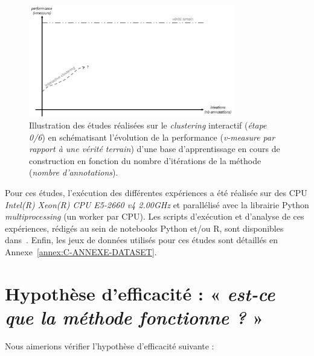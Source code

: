 	\begin{figure}[H]
		\centering
		\includegraphics[width=0.8\textwidth]{figures/hypotheses-00-default}
		\caption{Illustration des études réalisées sur le \textit{clustering} interactif (\textit{étape 0/6}) en schématisant l'évolution de la performance (\textit{v-measure par rapport à une vérité terrain}) d'une base d'apprentissage en cours de construction en fonction du nombre d'itérations de la méthode (\textit{nombre d'annotations}).}
		\label{figure:HYPOTHESE-00-DEFAULT}
	\end{figure}
	
	Pour ces études, l'exécution des différentes expériences a été réalisée sur des CPU \textit{Intel(R) Xeon(R) CPU E5-2660 v4 \@ 2.00GHz} et parallélisé avec la librairie Python \textit{multiprocessing} (un worker par CPU).
	Les scripts d'exécution et d'analyse de ces expériences, rédigés au sein de notebooks Python et/ou R, sont disponibles dans~\cite{schild:cognitivefactory-interactive-clustering-comparative-study:2021}.
	Enfin, les jeux de données utilisés pour ces études sont détaillés en Annexe~\ref{annex:C-ANNEXE-DATASET}.
	
	
    \minitoc

    \section{Hypothèse d'efficacité : « \textit{est-ce que la méthode fonctionne ?} »}
	\label{section:4.1-HYPOTHESE-EFFICACITE}
	
		Nous aimerions vérifier l'hypothèse d'efficacité suivante :

